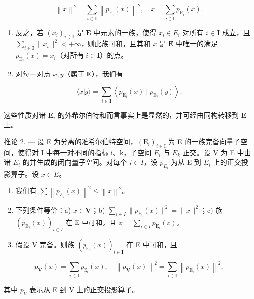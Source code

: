 \[
\left\| x \right\| ^ {2} = \sum_ {i \in \mathbf {I}} \left\| p _ {\mathrm{E} _ {i}} (x) \right\| ^ {2}, \quad x = \sum_ {i \in \mathbf {I}} p _ {\mathrm{E} _ {i}} (x).
\]

\begin{enumerate}
\def\labelenumi{\alph{enumi})}
\setcounter{enumi}{1}
\item
  反之，若 \((x_{i})_{i\in \mathbf{I}}\) 是 \(\mathbf{E}\) 中元素的一族，使得 \(x_{i}\in E_{i}\) 对所有 \(i\in \mathbf{I}\) 成立，且 \(\sum_{i\in \mathbf{I}}\| x_i\|^2 < + \infty\)，则此族可和，且其和 \(x\) 是 \(\mathbf{E}\) 中唯一的满足 \(p_{\mathrm{E}_i}(x) = x_i\)（对所有 \(i\in \mathbf{I}\)）的点。
\item
  对每一对点 \(x, y\)（属于 \(\mathbf{E}\)），我们有
\end{enumerate}

\[
\langle x | y \rangle = \sum_ {i \in \mathbf {I}} \left\langle p _ {\mathrm{E} _ {i}} (x) \mid p _ {\mathrm{E} _ {i}} (y) \right\rangle .
\]

这些性质对诸 \(\mathbf{E}_i\) 的外希尔伯特和而言事实上是显然的，并可经由同构转移到 \(\mathbf{E}\) 上。

推论 2. --- 设 E 为分离的准希尔伯特空间，\((\mathrm{E}_{i})_{i\in\mathrm{I}}\) 为 E 的一族完备向量子空间，使得对 I 中每一对不同的指标 i、k，子空间 \(E_{i}\) 与 \(E_{k}\) 正交。设 V 为 E 中由诸 \(E_{i}\) 的并生成的闭向量子空间。对每个 \(i\in I\)，设 \(p_{E_{i}}\) 为从 E 到 \(E_{i}\) 上的正交投影算子。设 \(x\in E\)。

\begin{enumerate}
\def\labelenumi{\arabic{enumi})}
\item
  我们有 \(\sum\left\|p_{E_{i}}(x)\right\|^{2}\leqslant\left\|x\right\|^{2}\)。
\item
  下列条件等价：a) \(x \in \mathbf{V}\)；b) \(\sum_{i \in I} \| p_{\mathrm{E}_i}(x) \|^2 = \| x \|^2\)；c) 族 \((p_{\mathrm{E}_i}(x))_{i \in I}\) 在 E 中可和，且 \(x = \sum_{i \in I} p_{\mathrm{E}_i}(x)\)。
\item
  假设 V 完备。则族 \((p_{\mathrm{E}_i}(x))_{i\in \mathbf{I}}\) 在 E 中可和，且
\end{enumerate}

\[
p _ {\mathbf {V}} (x) = \sum_ {i \in \mathbf {I}} p _ {\mathrm{E} _ {i}} (x), \quad \left\| p _ {\mathbf {V}} (x) \right\| ^ {2} = \sum_ {i \in \mathbf {I}} \left\| p _ {\mathrm{E} _ {i}} (x) \right\| ^ {2},
\]

其中 \(p_{V}\) 表示从 E 到 V 上的正交投影算子。

